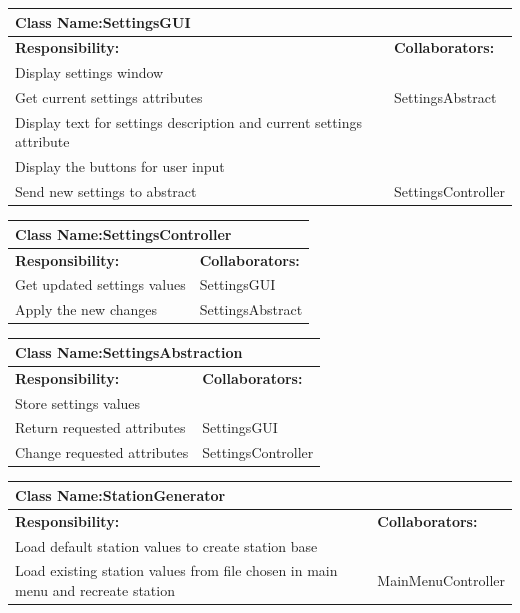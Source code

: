 \documentclass[]{article}
\begin{document}
	\begin{table}[ht]
		\centering
		\begin{tabular}{|p{5cm}|p{5cm}|}
		\hline 
		 \multicolumn{2}{|l|}{\textbf{Class Name:}SettingsGUI} \\
		\hline
		\textbf{Responsibility:} & \textbf{Collaborators:} \\
		\hline
		Display settings window & \\
		\hline
		Get current settings attributes & SettingsAbstract \\
		\hline
		Display text for settings description and current settings attribute & \\
		\hline
		Display the buttons for user input & \\
		\hline
		Send new settings to abstract & SettingsController \\
		\hline
		\end{tabular}
	\end{table}
	\begin{table}[ht]
		\centering
		\begin{tabular}{|p{5cm}|p{5cm}|}
		\hline 
		 \multicolumn{2}{|l|}{\textbf{Class Name:}SettingsController} \\
		\hline
		\textbf{Responsibility:} & \textbf{Collaborators:} \\
		\hline
		Get updated settings values & SettingsGUI\\
		\hline
		Apply the new changes & SettingsAbstract\\
		\hline
		\end{tabular}
	\end{table}
	\begin{table}[ht]
		\centering
		\begin{tabular}{|p{5cm}|p{5cm}|}
		\hline 
		 \multicolumn{2}{|l|}{\textbf{Class Name:}SettingsAbstraction} \\
		\hline
		\textbf{Responsibility:} & \textbf{Collaborators:} \\
		\hline
		Store settings values & \\
		\hline
		Return requested attributes & SettingsGUI\\
		\hline
		Change requested attributes & SettingsController\\
		\hline
		\end{tabular}
	\end{table}
	\begin{table}[ht]
		\centering
		\begin{tabular}{|p{5cm}|p{5cm}|}
		\hline 
		 \multicolumn{2}{|l|}{\textbf{Class Name:}StationGenerator} \\
		\hline
		\textbf{Responsibility:} & \textbf{Collaborators:} \\
		\hline
		Load default station values to create station base & \\
		\hline
		Load existing station values from file chosen in main menu and recreate station & MainMenuController\\
		\hline
		\end{tabular}
	\end{table}
\end{document}
